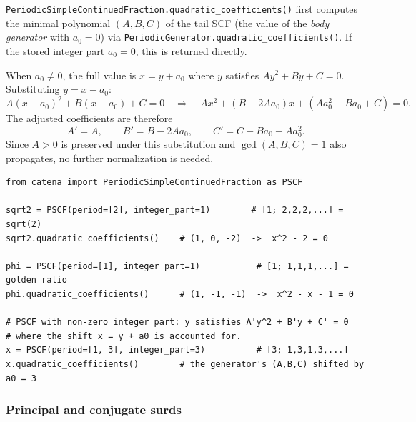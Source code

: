 \begin{remark}
  \texttt{PeriodicSimpleContinuedFraction.quadratic\_coefficients()} first computes the minimal
  polynomial $(A, B, C)$ of the tail SCF (the value of the \emph{body generator} with $a_0 = 0$)
  via \texttt{PeriodicGenerator.quadratic\_coefficients()}.  If the stored integer part $a_0 = 0$,
  this is returned directly.

  When $a_0 \neq 0$, the full value is $x = y + a_0$ where $y$ satisfies $Ay^2 + By + C = 0$.
  Substituting $y = x - a_0$:
  \[
    A(x - a_0)^2 + B(x - a_0) + C = 0
    \quad\Longrightarrow\quad
    Ax^2 + (B - 2Aa_0)x + (Aa_0^2 - Ba_0 + C) = 0.
  \]
  The adjusted coefficients are therefore
  \[
    A' = A, \qquad B' = B - 2Aa_0, \qquad C' = C - Ba_0 + Aa_0^2.
  \]
  Since $A > 0$ is preserved under this substitution and $\gcd(A, B, C) = 1$ also propagates,
  no further normalization is needed.
\end{remark}

\begin{catenadef}
\begin{lstlisting}[style=python]
from catena import PeriodicSimpleContinuedFraction as PSCF

sqrt2 = PSCF(period=[2], integer_part=1)        # [1; 2,2,2,...] = sqrt(2)
sqrt2.quadratic_coefficients()    # (1, 0, -2)  ->  x^2 - 2 = 0

phi = PSCF(period=[1], integer_part=1)           # [1; 1,1,1,...] = golden ratio
phi.quadratic_coefficients()      # (1, -1, -1)  ->  x^2 - x - 1 = 0

# PSCF with non-zero integer part: y satisfies A'y^2 + B'y + C' = 0
# where the shift x = y + a0 is accounted for.
x = PSCF(period=[1, 3], integer_part=3)          # [3; 1,3,1,3,...]
x.quadratic_coefficients()        # the generator's (A,B,C) shifted by a0 = 3
\end{lstlisting}
\end{catenadef}

\subsubsection{Principal and conjugate surds}

